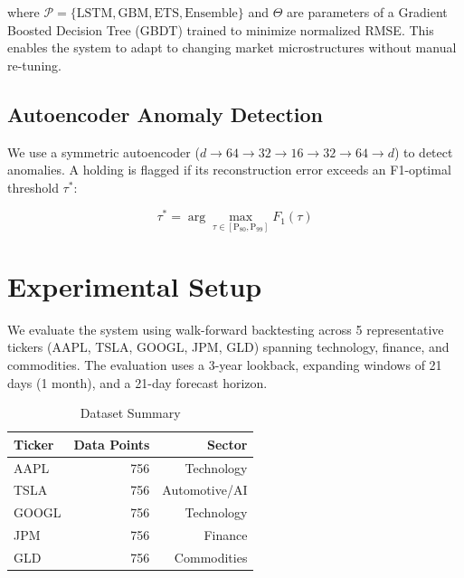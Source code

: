 \documentclass[conference]{IEEEtran}
\begin{document}
where $\mathcal{P} = \{\text{LSTM}, \text{GBM}, \text{ETS}, \text{Ensemble}\}$ 
and $\Theta$ are parameters of a Gradient Boosted Decision Tree (GBDT) 
trained to minimize normalized RMSE. This enables the system to adapt 
to changing market microstructures without manual re-tuning.

\subsection{Autoencoder Anomaly Detection}
\label{sec:anomaly}

We use a symmetric autoencoder ($d \to 64 \to 32 \to 16 \to 32 \to 64 \to d$) 
to detect anomalies. A holding is flagged if its reconstruction error 
exceeds an F1-optimal threshold $\tau^*$:

\begin{equation}
    \tau^* = \arg\max_{\tau \in [\text{P}_{80}, \text{P}_{99}]} F_1(\tau)
\end{equation}

\section{Experimental Setup}

We evaluate the system using walk-forward backtesting across 5 
representative tickers (AAPL, TSLA, GOOGL, JPM, GLD) spanning 
technology, finance, and commodities. The evaluation uses a 3-year 
lookback, expanding windows of 21 days (1 month), and a 21-day 
forecast horizon.

\begin{table}[htbp]
\centering
\caption{Dataset Summary}
\label{tab:dataset}
\begin{tabular}{lrr}
\toprule
\textbf{Ticker} & \textbf{Data Points} & \textbf{Sector} \\
\midrule
AAPL & 756 & Technology \\
TSLA & 756 & Automotive/AI \\
GOOGL & 756 & Technology \\
JPM & 756 & Finance \\
GLD & 756 & Commodities \\
\bottomrule
\end{tabular}
\end{table}

\end{document}
